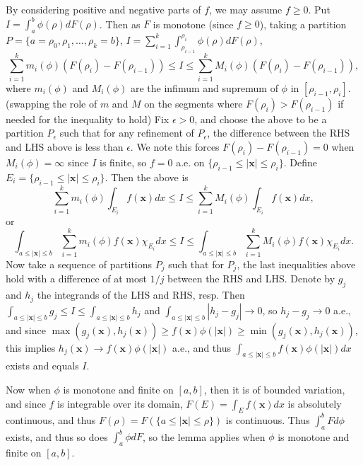 \documentclass{article}
\newcommand\abs[1]{\left|#1\right|}
\newcommand\xx{\mathbf{x}}
\begin{document}
By considering positive and negative parts of $f$, we may assume $f \geq 0$.
Put $I = \int_{a}^{b} \phi(\rho) dF(\rho)$. Then as $F$ is monotone (since $f \geq 0$), taking a partition $P = \{ a = \rho_{0}, \rho_{1}, \dots, \rho_{k} = b\}$, $I = \sum_{i=1}^{k} \int_{\rho_{i-1}}^{\rho_{i}} \phi(\rho) dF(\rho)$, 
\begin{equation*}
	\sum_{i=1}^{k} m_{i}(\phi)(F(\rho_{i}) - F(\rho_{i-1})) \leq I \leq \sum_{i=1}^{k} M_{i}(\phi)(F(\rho_{i}) - F(\rho_{i-1})), 
\end{equation*}
where $m_{i}(\phi)$ and $M_{i}(\phi)$ are the infimum and supremum of $\phi$ in $[\rho_{i-1}, \rho_{i}]$.
(swapping the role of $m$ and $M$ on the segments where $F(ρ_i) > F(ρ_{i-1})$ if needed for the inequality to hold) %
Fix $\epsilon > 0$, and choose the above to be a partition $P_{\epsilon}$ such that for any refinement of $P_{\epsilon}$, the difference between the RHS and LHS above is less than $\epsilon$. We note this forces $F(\rho_{i}) - F(\rho_{i-1}) = 0$ when $M_{i}(\phi) = \infty$ since $I$ is finite, so $f = 0$ a.e. on $\{ \rho_{i-1} \leq \abs{\xx} \leq \rho_{i} \}$. Define $E_{i} = \{ \rho_{i-1} \leq \abs{\xx} \leq \rho_{i} \}$. Then the above is 
\begin{equation*}
	\sum_{i=1}^{k} m_{i}(\phi)\int_{E_{i}} f(\xx) dx \leq I \leq \sum_{i=1}^{k} M_{i}(\phi)\int_{E_{i}} f(\xx) dx,
\end{equation*}
or 
\begin{equation*}
	\int_{a \leq \abs{\xx} \leq b} \sum_{i=1}^{k} m_{i}(\phi) f(\xx) \chi_{E_{i}} dx \leq I \leq \int_{a \leq \abs{\xx} \leq b} \sum_{i=1}^{k} M_{i}(\phi) f(\xx) \chi_{E_{i}} dx.
\end{equation*}
Now take a sequence of partitions $P_{j}$ such that for $P_{j}$, the last inequalities above hold with a difference of at most $1/j$ between the RHS and LHS. Denote by $g_{j}$ and $h_{j}$ the integrands of the LHS and RHS, resp. 
Then $\int_{a \leq \abs{\xx} \leq b} g_{j} \leq I \leq \int_{a \leq \abs{\xx} \leq b} h_{j}$
and $\int_{a \leq \abs{\xx} \leq b} |h_{j} - g_{j}| \rightarrow 0$,
so $h_{j} - g_{j} \rightarrow 0$ a.e., and
since
$
\max(g_j(\xx), h_{j}(\xx))
\geq f(\xx)\phi(\abs{\xx}) 
\geq 
\min(g_j(\xx), h_{j}(\xx))
$, this implies $h_{j}(\xx) \rightarrow f(\xx)\phi(\abs{\xx})$ a.e., and thus $\int_{a \leq \abs{\xx} \leq b} f(\xx) \phi(\abs{\xx})dx$ exists and equals $I$.

Now when $\phi$ is monotone and finite on $[a, b]$, then it is of bounded variation, and since $f$ is integrable over its domain, $F(E) = \int_{E} f(\xx) dx$ is absolutely continuous, and thus $F(\rho) = F(\{ a \leq \abs{\xx} \leq \rho \})$ is continuous. Thus $\int_{a}^{b} F d\phi$ exists, and thus so does $\int_{a}^{b} \phi dF$, so the lemma applies when $\phi$ is monotone and finite on $[a, b]$.
\end{document}
